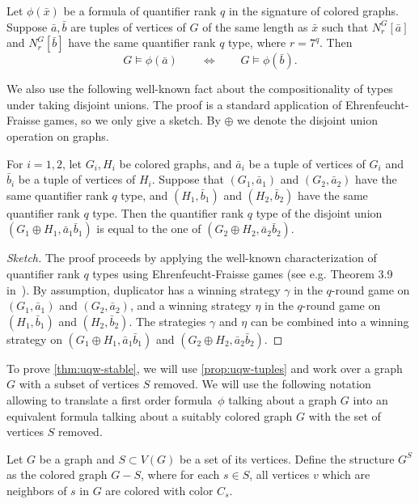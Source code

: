 \begin{lemma}\label{lem:gaifman}
	Let $\phi(\bar x)$ be a  formula 
	of quantifier rank $q$
	in the signature of colored graphs. 
	Suppose $\bar a,\bar b$ are tuples of vertices of $G$ of the same length as $\bar x$ such that $N^G_r[\bar a]$ and $N^G_r[\bar b]$ have the same quantifier rank $q$ type, where $r=7^q$. Then
 $$G\models \phi(\bar a)\qquad\iff \qquad G\models \phi(\bar b).$$
\end{lemma}

We also use the following well-known fact about the compositionality of types 
under taking disjoint unions. The proof is a standard application of Ehrenfeucht-Fraisse games, so we only give a sketch. By $\oplus$ we denote the disjoint union operation on graphs.
		\begin{lemma}\label{lem:type-union}
			For $i=1,2$, let $G_i,H_i$ be colored graphs,
			and $\bar a_i$ be a tuple of vertices of $G_i$
			and $\bar b_i$ be a tuple of vertices of $H_i$.
			Suppose that $(G_1,\bar a_1)$ and $(G_2,\bar a_2)$ 
			have the same quantifier rank $q$ type,
			and $(H_1,\bar b_1)$ and $(H_2,\bar b_2)$ 
			have the same quantifier rank $q$ type.			
			Then the quantifier rank $q$ type of the disjoint union 
			$(G_1\oplus H_1,\bar a_1\bar b_1)$ is equal to the one of $(G_2\oplus H_2,\bar a_2\bar b_2)$. \end{lemma}
\begin{proof}[Sketch]
	The proof proceeds by applying the well-known characterization 
	of quantifier rank $q$  types using Ehrenfeucht-Fraisse games (see e.g. Theorem 3.9 in~\cite{libkin}). By assumption, duplicator has a winning strategy $\gamma$ in the $q$-round game on $(G_1,\bar a_1)$ and $(G_2,\bar a_2)$, and a winning strategy $\eta$ in the $q$-round game on $(H_1,\bar b_1)$ and $(H_2,\bar b_2)$. The strategies $\gamma$ and $\eta$ can be combined into a winning strategy on $(G_1\oplus H_1,\bar a_1\bar b_1)$ and $(G_2\oplus H_2,\bar a_2\bar b_2)$.
\end{proof}


\medskip
To prove \cref{thm:uqw-stable}, we will use \cref{prop:uqw-tuples} and work over a graph $G$
with a subset of vertices $S$ removed.
We will use the following notation allowing to translate a first order formula~$\phi$ talking about a graph $G$ into an equivalent formula talking 
about a suitably colored  graph $G$ with the set of vertices $S$ removed.

Let $G$ be a graph and $S\subset V(G)$
be a set of its vertices.
Define the structure $G^{S}$
as the colored graph $G-S$, where for each $s\in S$, all vertices $v$
which are neighbors of $s$ in $G$ are colored with color $C_s$.

